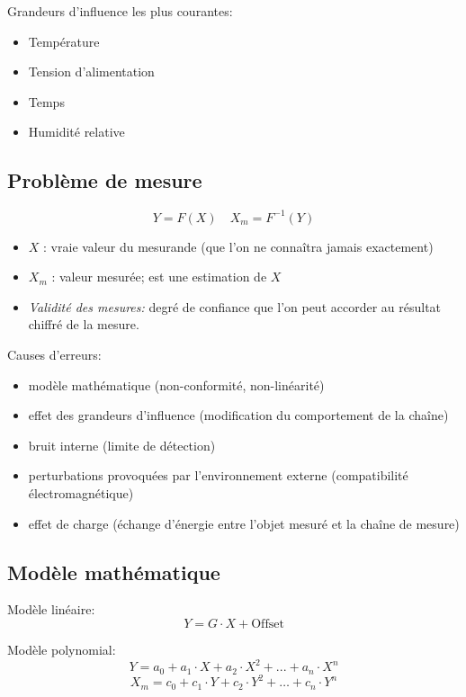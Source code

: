 \documentclass[10pt, twocolumn]{article}
\begin{document}
			Grandeurs d'influence les plus courantes: 
			
			\begin{itemize}
				\item Température
				\item Tension d'alimentation
				\item Temps
				\item Humidité relative
			\end{itemize}
		
		\subsection*{Problème de mesure}
		
			\[Y = F(X) \quad X_m=F^{-1}(Y)\]
			
			\begin{itemize}
				\item $X$ : vraie valeur du mesurande (que l'on ne connaîtra jamais exactement)
				\item $X_m$ : valeur mesurée; est une estimation de $X$
				\item \emph{Validité des mesures:} degré de confiance que l'on peut accorder au résultat chiffré de la mesure.
			\end{itemize}
			
			Causes d'erreurs:
		
			\begin{itemize}
				\item modèle mathématique (non-conformité, non-linéarité)
				\item effet des grandeurs d'influence (modification du comportement de la chaîne)
				\item bruit interne (limite de détection)
				\item perturbations provoquées par l'environnement externe (compatibilité électromagnétique)
				\item effet de charge (échange d'énergie entre l'objet mesuré et la chaîne de mesure)
			\end{itemize}
			
		\subsection*{Modèle mathématique}
			
			Modèle linéaire:
			\[Y = G \cdot X + \text{Offset}\]
			
			Modèle polynomial:
			\[Y=a_0+a_1\cdot X+a_2\cdot X^2+...+a_n\cdot X^n\]
			\[X_{m}=c_{0}+c_{1} \cdot Y+c_{2} \cdot Y^{2}+\ldots+c_{n} \cdot Y^{n}\]
		
\end{document}
